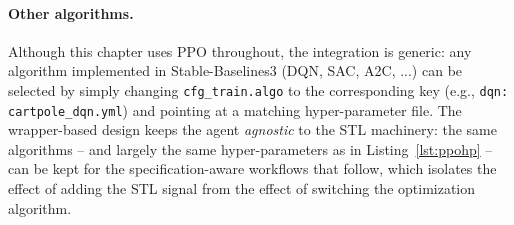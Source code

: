 \paragraph{Other algorithms.}
Although this chapter uses PPO throughout, the integration is generic: any
algorithm implemented in Stable-Baselines3 (DQN, SAC, A2C, ...) can be selected by
simply changing \texttt{cfg\_train.algo} to the corresponding key (e.g.,
\texttt{dqn: cartpole\_dqn.yml}) and pointing at a matching hyper-parameter file.
The wrapper-based design keeps the agent \emph{agnostic} to the STL machinery: the
same algorithms -- and largely the same hyper-parameters as in
Listing~\ref{lst:ppohp} -- can be kept for the specification-aware workflows that
follow, which isolates the effect of adding the STL signal from the effect of
switching the optimization algorithm.

